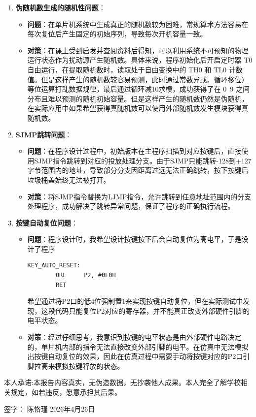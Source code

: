 \documentclass[12pt,a4paper]{article}
\begin{document}
\begin{enumerate}
    \item \textbf{伪随机数生成的随机性问题}：
    \begin{itemize}
        \item \textbf{问题}：在单片机系统中生成真正的随机数较为困难，常规算术方法容易在每次复位后产生固定的初始序列，导致每次开机容量一致。
        \item \textbf{对策}：在课上受到启发并查阅资料后得知，可以利用系统不可预知的物理运行状态作为扰动源产生随机数。具体来说，程序初始化后开启定时器 T0 自由运行，在提取随机数时，读取处于自由变换中的 TH0 和 TL0 计数值。但是这样产生的随机数较容易预测，此时通过常数异或、循环移位）等位运算打乱数据规律，最后通过循环减10求模，成功获得了在 0~9 之间分布且难以预测的随机初始容量。但是这样产生的随机数仍然是伪随机，在实际应用中如果希望获得真随机数可以使用外部随机数发生模块获得真随机数。
    \end{itemize}
    
    \item \textbf{SJMP跳转问题}：
    \begin{itemize}
        \item \textbf{问题}：在程序设计过程中，初始版本在主程序扫描到对应按键后，直接使用SJMP指令跳转到对应的投放处理分支。由于SJMP只能跳转-128到+127字节范围内的地址，导致部分分支因距离过远无法正确跳转，按下按键后垃圾桶盖始终无法被打开。
        \item \textbf{对策}：将SJMP指令替换为LJMP指令，允许跳转到任意地址范围内的分支处理程序，成功解决了跳转异常问题，保证了程序的正确执行流程。
    \end{itemize}
    
    \item \textbf{按键自动复位问题}：
    \begin{itemize}
        \item \textbf{问题}：程序设计时，我希望设计按键按下后会自动复位为高电平，于是设计了程序
        \begin{lstlisting}[language={[x86masm]Assembler}]
        KEY_AUTO_RESET:
        ORL     P2, #0F0H
        RET
        \end{lstlisting}
        希望通过将P2口的低4位强制置1来实现按键自动复位，但在实际测试中发现，这段代码只能复位P2对应的寄存器，并不能真正改变外部硬件引脚的电平状态。
        \item \textbf{对策}：经过仔细思考，我意识到按键的电平状态是由外部硬件电路决定的，单片机内部的指令无法直接改变外部引脚的电平。在仿真中无法模拟出按键自动复位的效果，因此在仿真过程中需要手动将按键对应的P2口引脚拉高来模拟按键释放的状态。
    \end{itemize}
\end{enumerate}

\vspace{2cm}
\noindent
本人承诺:本报告内容真实，无伪造数据，无抄袭他人成果。本人完全了解学校相关规定，如若违反，愿意承担其后果。

\vspace{1cm}
\noindent
签字：\hspace{3cm} 陈恪瑾 \hspace{3cm} 2026年4月26日
\end{document}

